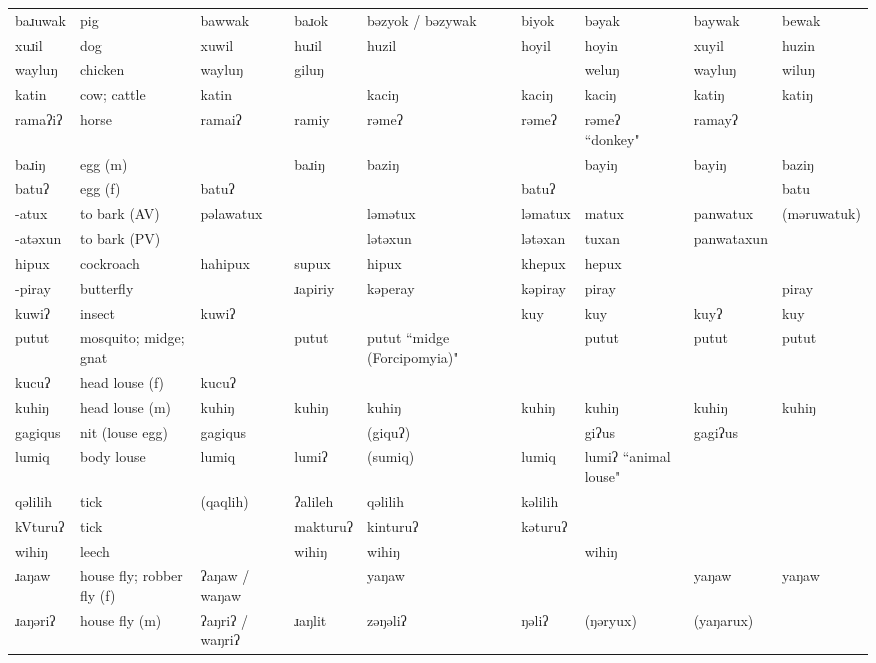 \begin{landscape}
\begin{longtable}{*{9}{>{\raggedright\arraybackslash}p{}}}
\text{*}baɹuwak & pig & bawwak & baɹok & bəzyok / bəzywak & biyok & bəyak & baywak & bewak\\
\text{*}xuɹil & dog & xuwil & huɹil & huzil & hoyil & hoyin & xuyil & huzin\\
\text{*}wayluŋ & chicken & wayluŋ & giluŋ &  &  & weluŋ & wayluŋ & wiluŋ\\
\text{*}katin & cow; cattle & katin &  & kaciŋ & kaciŋ & kaciŋ & katiŋ & katiŋ\\
\text{*}ramaʔiʔ & horse & ramaiʔ & ramiy & rəmeʔ & rəmeʔ & rəmeʔ ``donkey" & ramayʔ & \\
\text{*}baɹiŋ & egg (m) &  & baɹiŋ & baziŋ &  & bayiŋ & bayiŋ & baziŋ\\
\text{*}batuʔ & egg (f) & batuʔ &  &  & batuʔ &  &  & batu\\
\text{*}-atux & to bark (AV) & pəlawatux &  & ləmətux & ləmatux & matux & panwatux & (məruwatuk)\\
\text{*}-atəxun & to bark (PV) &  &  & lətəxun & lətəxan & tuxan & panwataxun & \\
\text{*}hipux & cockroach & hahipux & supux & hipux & khepux & hepux &  & \\
\text{*}-piray & butterfly &  & ɹapiriy & kəperay & kəpiray & piray &  & piray\\
\text{*}kuwiʔ & insect & kuwiʔ &  &  & kuy & kuy & kuyʔ & kuy\\
\text{*}putut & mosquito; midge; gnat &  & putut & putut ``midge (Forcipomyia)" &  & putut & putut & putut\\
\text{*}kucuʔ & head louse (f) & kucuʔ &  &  &  &  &  & \\
\text{*}kuhiŋ & head louse (m) & kuhiŋ & kuhiŋ & kuhiŋ & kuhiŋ & kuhiŋ & kuhiŋ & kuhiŋ\\
\text{*}gagiqus & nit (louse egg) & gagiqus &  & (giquʔ) &  & giʔus & gagiʔus & \\
\text{*}lumiq & body louse & lumiq & lumiʔ & (sumiq) & lumiq & lumiʔ ``animal louse" &  & \\
\text{*}qəlilih & tick & (qaqlih) & ʔalileh & qəlilih & kəlilih &  &  & \\
\text{*}kVturuʔ & tick &  & makturuʔ & kinturuʔ & kəturuʔ &  &  & \\
\text{*}wihiŋ & leech &  & wihiŋ & wihiŋ &  & wihiŋ &  & \\
\text{*}ɹaŋaw & house fly; robber fly (f) & ʔaŋaw / waŋaw &  & yaŋaw &  &  & yaŋaw & yaŋaw\\
\text{*}ɹaŋəriʔ & house fly (m) & ʔaŋriʔ / waŋriʔ & ɹaŋlit & zəŋəliʔ & ŋəliʔ & (ŋəryux) & (yaŋarux) & \\

\end{longtable}
\end{landscape}

